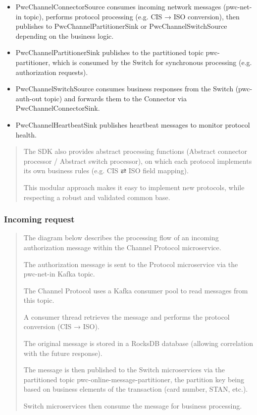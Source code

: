 \documentclass[12pt,a4paper]{report}
\begin{document}
\begin{itemize}
\item
  PwcChannelConnectorSource consumes incoming network messages
  (pwc-net-in topic), performs protocol processing (e.g. CIS → ISO
  conversion), then publishes to PwcChannelPartitionerSink or
  PwcChannelSwitchSource depending on the business logic.
\item
  PwcChannelPartitionerSink publishes to the partitioned topic
  pwc-partitioner, which is consumed by the Switch for synchronous
  processing (e.g. authorization requests).
\item
  PwcChannelSwitchSource consumes business responses from the Switch
  (pwc-auth-out topic) and forwards them to the Connector via
  PwcChannelConnectorSink.
\item
  PwcChannelHeartbeatSink publishes heartbeat messages to monitor
  protocol health.
\end{itemize}

\begin{quote}
The SDK also provides abstract processing functions (Abstract connector
processor / Abstract switch processor), on which each protocol
implements its own business rules (e.g. CIS ⇄ ISO field mapping).

This modular approach makes it easy to implement new protocols, while
respecting a robust and validated common base.
\end{quote}

\hypertarget{incoming-request-1}{%
\subsubsection{\texorpdfstring{\textbf{Incoming
request}}{Incoming request}}\label{incoming-request-1}}

\begin{quote}
The diagram below describes the processing flow of an incoming
authorization message within the Channel Protocol microservice.

The authorization message is sent to the Protocol microservice via the
pwc-net-in Kafka topic.

The Channel Protocol uses a Kafka consumer pool to read messages from
this topic.

A consumer thread retrieves the message and performs the protocol
conversion (CIS → ISO).

The original message is stored in a RocksDB database (allowing
correlation with the future response).

The message is then published to the Switch microservices via the
partitioned topic pwc-online-message-partitioner, the partition key
being based on business elements of the transaction (card number, STAN,
etc.).

Switch microservices then consume the message for business processing.
\end{quote}
\end{document}
